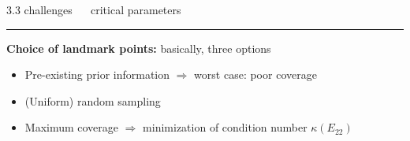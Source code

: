 \documentclass[11pt, compress, t, notes = noshow, xcolor = table, 
aspectratio = 1610]{beamer}
\newcommand{\highlight}[1]{\textcolor{highlightcol}{\textbf{#1}}}
\newcommand{\flexitem}[1]{\item[$\highlight{#1}$]}
\begin{document}
\LARGE
\begin{frame}{\textcolor{gray!90}{3.3 challenges} ~~ critical parameters}
\normalsize
\vspace{-0.5cm}
\noindent \textcolor{gray!90}{\rule{\textwidth}{1pt}}
\smallskip

\textbf{Choice of landmark points:} basically, three options

\begin{itemize}
  \flexitem{1} Pre-existing prior information $\Rightarrow$ worst case: poor 
  coverage
  \flexitem{2} (Uniform) random sampling
  \flexitem{3} Maximum coverage $\Rightarrow$ minimization of condition number 
  $\kappa(E_{22})$
\end{itemize}



\end{frame}
\end{document}
